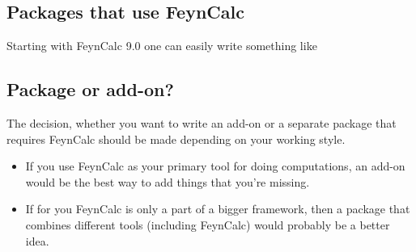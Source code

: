 \documentclass[../FeynCalcManual.tex]{subfiles}
\begin{document}
\hypertarget{packages-that-use-feyncalc}{%
\subsection{Packages that use
FeynCalc}\label{packages-that-use-feyncalc}}

Starting with FeynCalc 9.0 one can easily write something like

\begin{Shaded}
\begin{Highlighting}[]
\OperatorTok{[}\OperatorTok{,\{}\OperatorTok{\}]}

\ExtensionTok{=}
\NormalTok{;}

\OperatorTok{[}\OperatorTok{]}\NormalTok{;}

\OperatorTok{[}\OperatorTok{,}\OperatorTok{]}\ExtensionTok{:=}\OperatorTok{[}\OperatorTok{[}\OperatorTok{,}\OperatorTok{]]}\NormalTok{;}

\OperatorTok{[]}
\OperatorTok{[]}
\end{Highlighting}
\end{Shaded}

\hypertarget{package-or-add-on}{%
\subsection{Package or add-on?}\label{package-or-add-on}}

The decision, whether you want to write an add-on or a separate package
that requires FeynCalc should be made depending on your working style.

\begin{itemize}
\tightlist
\item
  If you use FeynCalc as your primary tool for doing computations, an
  add-on would be the best way to add things that you're missing.
\item
  If for you FeynCalc is only a part of a bigger framework, then a
  package that combines different tools (including FeynCalc) would
  probably be a better idea.
\end{itemize}
\end{document}
